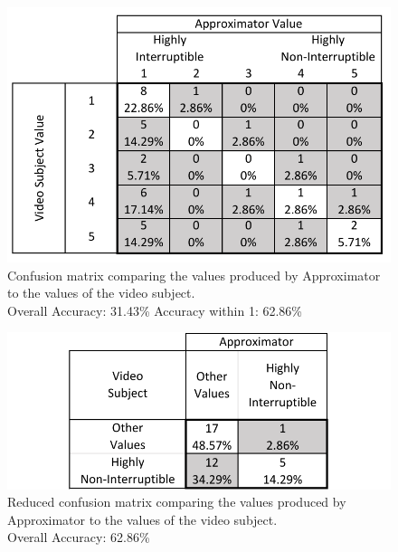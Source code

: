 \documentclass{sigchi}
\begin{document}
\begin{figure}[h]
  \centering
  \includegraphics[width=\columnwidth]{figures/VideoToApproximatorConfusionMatrix.pdf}
  \caption{Confusion matrix comparing the values produced by Approximator to the values of the video subject. \\Overall Accuracy: 31.43\% Accuracy within 1: 62.86\%}
  \label{fig:video_to_approximator_matrix}
\end{figure}

\begin{figure}[h]
  \centering
  \includegraphics[width=\columnwidth]{figures/VideoToApproximatorReducedConfusionMatrix.pdf}
  \caption{Reduced confusion matrix comparing the values produced by Approximator to the values of the video subject. \\Overall Accuracy: 62.86\%}
  \label{fig:reduced_video_to_approximator_matrix}
\end{figure}
\end{document}
